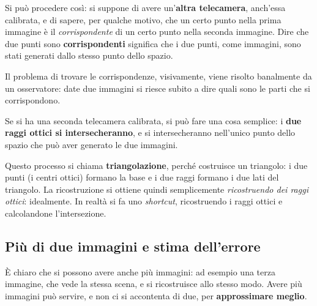 Si può procedere così: si suppone di avere un'\textbf{altra telecamera}, anch'essa calibrata, e di sapere, per qualche motivo, che un certo punto nella prima immagine è il \emph{corrispondente} di un certo punto nella seconda immagine. Dire che due punti sono \textbf{corrispondenti} significa che i due punti, come immagini, sono stati generati dallo stesso punto dello spazio.

Il problema di trovare le corrispondenze, visivamente, viene risolto banalmente da un osservatore: date due immagini si riesce subito a dire quali sono le parti che si corrispondono.

\begin{center}
\end{center}

Se si ha una seconda telecamera calibrata, si può fare una cosa semplice: i \textbf{due raggi ottici si intersecheranno}, e si intersecheranno nell'unico punto dello spazio che può aver generato le due immagini.

Questo processo si chiama \textbf{triangolazione}, perché costruisce un triangolo: i due punti (i centri ottici) formano la base e i due raggi formano i due lati del triangolo. La ricostruzione si ottiene quindi semplicemente \emph{ricostruendo dei raggi ottici}: idealmente. In realtà si fa uno \emph{shortcut}, ricostruendo i raggi ottici e calcolandone l'intersezione.

\subsection{Più di due immagini e stima dell'errore}

È chiaro che si possono avere anche più immagini: ad esempio una terza immagine, che vede la stessa scena, e si ricostruisce allo stesso modo. Avere più immagini può servire, e non ci si accontenta di due, per \textbf{approssimare meglio}.

